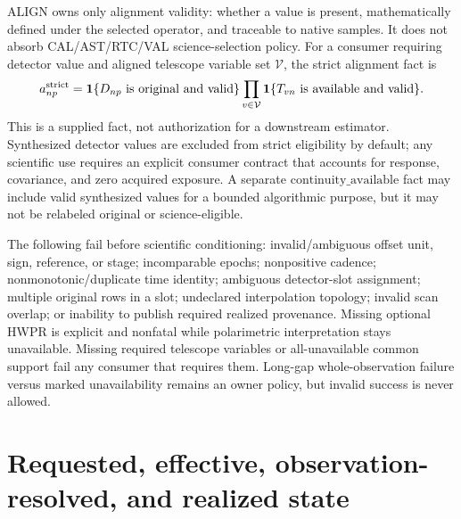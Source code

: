 \documentclass[11pt]{article}
\newcommand{\state}[1]{\mathrm{#1}}
\begin{document}
ALIGN owns only alignment validity: whether a value is present, mathematically
defined under the selected operator, and traceable to native samples.  It does
not absorb CAL/AST/RTC/VAL science-selection policy.  For a consumer requiring
detector value and aligned telescope variable set \(\mathcal V\), the strict
alignment fact is
\begin{equation}
 a_{np}^{\rm strict}=
 \mathbf1\{D_{np}\text{ is original and valid}\}
 \prod_{v\in\mathcal V}\mathbf1\{T_{vn}\text{ is available and valid}\}.
 \label{eq:strict-eligibility}
\end{equation}
This is a supplied fact, not authorization for a downstream estimator.
Synthesized detector values are excluded from strict eligibility by default;
any scientific use requires an explicit consumer contract that accounts for
response, covariance, and zero acquired exposure.  A separate
\(\state{continuity\_available}\) fact may include valid synthesized values for
a bounded algorithmic purpose, but it may not be relabeled original or
science-eligible.

The following fail before scientific conditioning: invalid/ambiguous offset
unit, sign, reference, or stage; incomparable epochs; nonpositive cadence;
nonmonotonic/duplicate time identity; ambiguous detector-slot assignment;
multiple original rows in a slot; undeclared interpolation topology; invalid
scan overlap; or inability to publish required realized provenance.  Missing
optional HWPR is explicit and nonfatal while polarimetric interpretation stays
unavailable.  Missing required telescope variables or all-unavailable common
support fail any consumer that requires them.  Long-gap whole-observation
failure versus marked unavailability remains an owner policy, but invalid
success is never allowed.

\section{Requested, effective, observation-resolved, and realized state}
\end{document}
